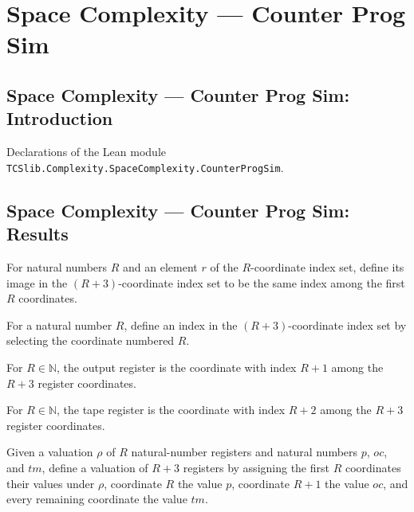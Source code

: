 \section{Space Complexity --- Counter Prog Sim}
\subsection*{Space Complexity --- Counter Prog Sim: Introduction}

Declarations of the Lean module \texttt{TCSlib.Complexity.SpaceComplexity.CounterProgSim}.

\subsection*{Space Complexity --- Counter Prog Sim: Results}

\begin{definition}
\label{Complexity.CPSim.rg}
\leanok
For natural numbers $R$ and an element $r$ of the $R$-coordinate index set, define its
image in the $(R+3)$-coordinate index set to be the same index among the first $R$
coordinates.
\end{definition}

\begin{definition}
\label{Complexity.CPSim.rP}
\leanok
For a natural number $R$, define an index in the $(R+3)$-coordinate index set by
selecting the coordinate numbered $R$.
\end{definition}

\begin{definition}
\label{Complexity.CPSim.rO}
\leanok
For $R\in\mathbb N$, the output register is the coordinate with index $R+1$ among the
$R+3$ register coordinates.
\end{definition}

\begin{definition}
\label{Complexity.CPSim.rT}
\leanok
For $R\in\mathbb N$, the tape register is the coordinate with index $R+2$ among the
$R+3$ register coordinates.
\end{definition}

\begin{definition}
\label{Complexity.CPSim.ev}
\leanok
Given a valuation $\rho$ of $R$ natural-number registers and natural numbers $p$, $oc$,
and $tm$, define a valuation of $R+3$ registers by assigning the first $R$ coordinates
their values under $\rho$, coordinate $R$ the value $p$, coordinate $R+1$ the value
$oc$, and every remaining coordinate the value $tm$.
\end{definition}

